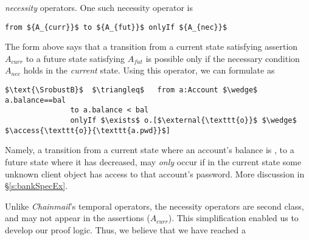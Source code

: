   \emph{necessity} operators. 
 One such necessity operator is
 
 \begin{lstlisting}[mathescape=true, language=chainmail, frame=lines]
                                from ${A_{curr}}$ to ${A_{fut}}$ onlyIf ${A_{nec}}$ 
\end{lstlisting}
The  form   {above} says that %
a  {transition} from a current state satisfying assertion $A_{curr}$ to a future
state satisfying $A_{fut}$ %
is possible only if the   necessary 
condition
$A_{nec}$ holds in the \emph{current} state.
Using %
this operator, we can formulate  \SrobustB %
as
\begin{lstlisting}[language = Chainmail, mathescape=true, frame=lines]
$\text{\SrobustB}$  $\triangleq$   from a:Account $\wedge$ a.balance==bal
               to a.balance < bal
               onlyIf $\exists$ o.[$\external{\texttt{o}}$ $\wedge$ $\access{\texttt{o}}{\texttt{a.pwd}}$]
\end{lstlisting}
Namely, a transition from a  {current} state where an account's balance is , to a  {future} state where 
it has decreased, may \emph{only} occur if  {in the current state} some unknown client object  
has access to that account's password. 
More discussion in \S\ref{s:bankSpecEx}. 

  
Unlike  \emph{Chainmail}'s temporal operators, 
 the necessity operators %
 are second class, and may not appear in the assertions  {(\eg  ${A_{curr}}$)}. 
 This simplification enabled us to develop our proof logic. 
 Thus, we believe that we have reached a 



